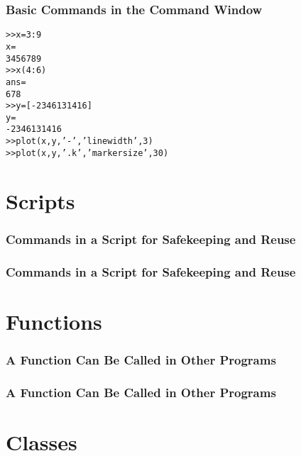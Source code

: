\documentclass[12pt, compress,xcolor={usenames,dvipsnames}]{beamer} %
\begin{document}
\begin{frame}[fragile]\frametitle{Basic Commands in the Command Window}
\begin{alltt}
>> x = 3:9 %set x to be a vector of inputs
x =
     3     4     5     6     7     8     9
>> x(4:6) %display the 4th through 6th elements
ans =
    6     7     8
>> y = [-2 3 4 6 13 14 16] %a vector of outputs
y =
    -2     3     4     6    13    14    16
>> plot(x,y,'-','linewidth',3) %connected by line segments
>> plot(x,y,'.k','markersize',30) %plot points as dots
\end{alltt}
\end{frame}

\section{Scripts}

\begin{frame}[fragile]\frametitle{Commands in a Script for Safekeeping and Reuse}
	\vspace{-8ex}

\end{frame}

\begin{frame}[fragile]\frametitle{Commands in a Script for Safekeeping and Reuse}
	\vspace{-8ex}
	
\end{frame}

\section{Functions}
	
\begin{frame}[fragile]\frametitle{A Function Can Be Called in Other Programs}
	\vspace{-8ex}
		
\end{frame}
	
\begin{frame}[fragile]\frametitle{A Function Can Be Called in Other Programs}
	\vspace{-8ex}
		
\end{frame}


\section{Classes}
\end{document}
